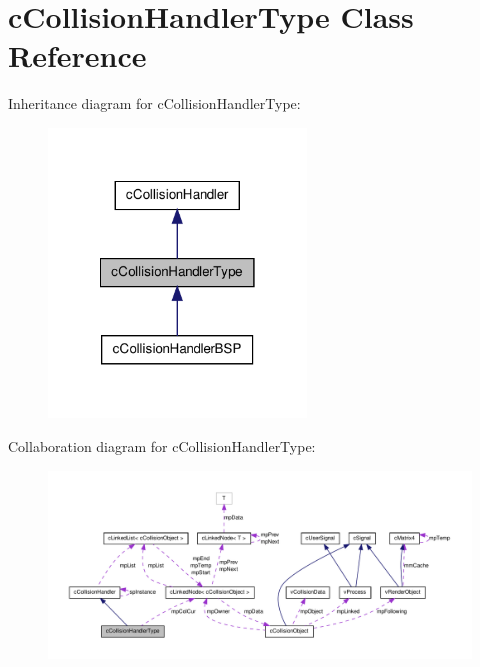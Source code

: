 \hypertarget{classc_collision_handler_type}{
\section{cCollisionHandlerType Class Reference}
\label{classc_collision_handler_type}
}


Inheritance diagram for cCollisionHandlerType:
\nopagebreak
\begin{figure}[H]
\begin{center}
\leavevmode
\includegraphics[width=194pt]{classc_collision_handler_type__inherit__graph}
\end{center}
\end{figure}


Collaboration diagram for cCollisionHandlerType:
\nopagebreak
\begin{figure}[H]
\begin{center}
\leavevmode
\includegraphics[width=400pt]{classc_collision_handler_type__coll__graph}
\end{center}
\end{figure}

